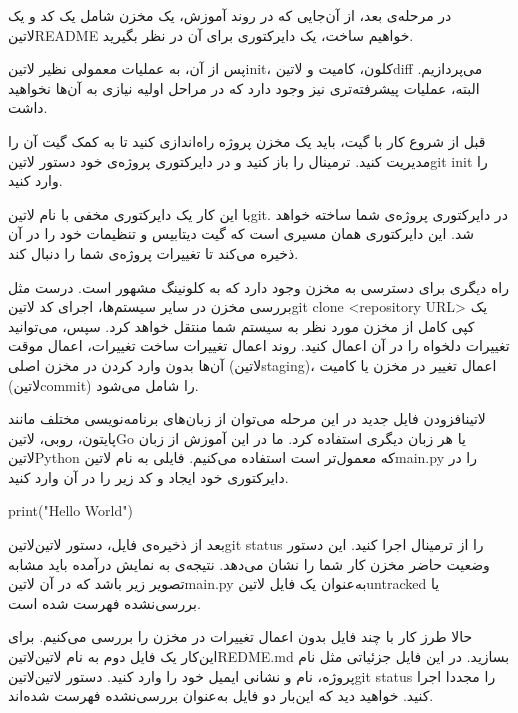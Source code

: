 در مرحله‌ی بعد، از آن‌جایی که در روند آموزش، یک مخزن شامل یک کد و یک ‌لاتین{README} خواهیم ساخت، یک دایرکتوری برای آن در نظر بگیرید.

پس از آن، به عملیات معمولی نظیر ‌لاتین{init}، کلون، کامیت و ‌لاتین{diff} می‌پردازیم. البته، عملیات پیشرفته‌تری نیز وجود دارد که در مراحل اولیه نیازی به آن‌ها نخواهید داشت.

قبل از شروع کار با گیت، باید یک مخزن پروژه راه‌اندازی کنید تا به کمک گیت آن را مدیریت کنید. ترمینال را باز کنید و در دایرکتوری پروژه‌ی خود دستور ‌لاتین{git init} را وارد کنید.

با این کار یک دایرکتوری مخفی با نام ‌لاتین{git.} در دایرکتوری پروژه‌ی شما ساخته خواهد شد. این دایرکتوری همان مسیری است که گیت دیتابیس و تنظیمات خود را در آن ذخیره می‌کند تا تغییرات پروژه‌ی شما را دنبال کند.

راه دیگری برای دسترسی به مخزن وجود دارد که به کلونینگ مشهور است. درست مثل بررسی مخزن در سایر سیستم‌ها، اجرای کد ‌لاتین{git clone <repository URL> } یک کپی کامل از مخزن مورد نظر به سیستم شما منتقل خواهد کرد. سپس، می‌توانید تغییرات دلخواه را در آن اعمال کنید. روند اعمال تغییرات ساخت تغییرات، اعمال موقت آن‌ها بدون وارد کردن در مخزن اصلی (‌لاتین{staging})، اعمال تغییر در مخزن یا کامیت (‌لاتین{commit}) را شامل می‌شود.

‌لاتین{افزودن فایل جدید}
در این مرحله می‌توان از زبان‌های برنامه‌نویسی مختلف مانند پایتون، روبی، ‌لاتین{Go} یا هر زبان دیگری استفاده کرد. ما در این آموزش از زبان ‌لاتین{Python} که معمول‌تر است استفاده می‌کنیم. فایلی به نام ‌لاتین{main.py} را در دایرکتوری خود ایجاد و کد زیر را در آن وارد کنید.

\begin{latin}
	print("Hello World")
\end{latin}

بعد از ذخیره‌ی فایل، دستور ‌لاتین{‌لاتین{git status}} را از ترمینال اجرا کنید. این دستور وضعیت حاضر مخزن کار شما را نشان می‌دهد. نتیجه‌ی به نمایش درآمده باید مشابه تصویر زیر باشد که در آن ‌لاتین{main.py} به‌عنوان یک فایل ‌لاتین{untracked} یا بررسی‌نشده فهرست شده است.

حالا طرز کار با چند فایل بدون اعمال تغییرات در مخزن را بررسی می‌کنیم. برای این‌کار یک فایل دوم به نام ‌لاتین{‌لاتین{REDME.md}} بسازید. در این فایل جزئیاتی مثل نام پروژه، نام و نشانی ایمیل خود را وارد کنید. دستور  لاتین{‌لاتین{git status}} را مجددا اجرا کنید. خواهید دید که این‌بار دو فایل به‌عنوان بررسی‌نشده فهرست شده‌اند.

